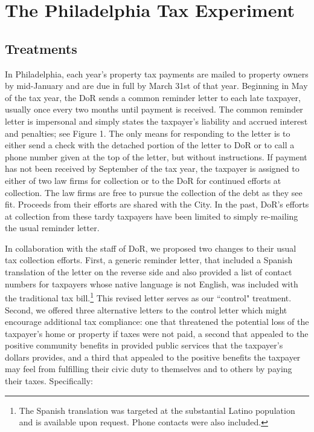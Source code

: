 \documentclass[12pt,titlepage]{article}
\begin{document}
\section{The Philadelphia Tax Experiment}

\subsection{Treatments}

In Philadelphia, each year's property tax payments are mailed to
property owners by mid-January and are due in full by March 31st of
that year.  Beginning in May of the tax year, the DoR sends a common
reminder letter to each late taxpayer, usually once every two months
until payment is received.  The common reminder letter is impersonal
and simply states the taxpayer's liability and accrued interest and
penalties; see Figure 1.  The only means for responding to the letter
is to either send a check with the detached portion of the letter to
DoR or to call a phone number given at the top of the letter, but
without instructions.  If payment has not been received by September
of the tax year, the taxpayer is assigned
to either of two law firms for collection or to the DoR
for continued efforts at collection.  The law firms are free to pursue
the collection of the debt as they see fit.  Proceeds from their
efforts are shared with the City.  In the past, DoR's efforts at
collection from these tardy taxpayers have been limited to simply
re-mailing the usual reminder letter.

In collaboration with the staff of DoR, we proposed two changes to
their usual tax collection efforts.  First, a generic reminder letter,
that included a Spanish translation of the letter on the reverse side
and also provided a list of contact numbers for taxpayers whose
native language is not English, was included with the traditional tax
bill.\footnote{The Spanish translation was targeted at the substantial Latino
  population and is available upon request. 
   Phone contacts were also included.}  This revised
letter serves as our ``control" treatment.  Second, we offered three
alternative letters to the control letter which might encourage
additional tax compliance: one that threatened the potential loss of
the taxpayer's home or property if taxes were not paid, a second that
appealed to the positive community benefits in provided public
services that the taxpayer's dollars provides, and a third that appealed
to the positive benefits the taxpayer may feel from fulfilling their
civic duty to themselves and to others by paying their taxes.
Specifically:
\end{document}
